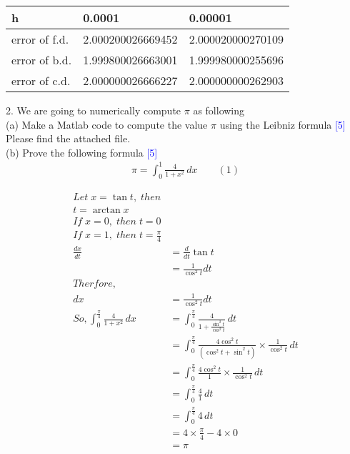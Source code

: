 \documentclass{article}
\begin{document}
\begin{table}[h]
\begin{tabular}{l|ll}
h             & 0.0001            & 0.00001           \\ \hline
error of f.d. & 2.000200026669452 & 2.000020000270109 \\
error of b.d. & 1.999800026663001 & 1.999980000255696 \\
error of c.d. & 2.000000026666227 & 2.000000000262903
\end{tabular}
\end{table}

\Large
2. We are going to numerically compute $\pi$ as following\\

\large
(a) Make a Matlab code to compute the value $\pi$ using the Leibniz formula \textcolor{blue}{[5]}\\

Please find the attached file.\\

(b) Prove the following formula \textcolor{blue}{[5]}\\

\begin{align*}
\pi = \int_{0}^{1} \frac{4}{1+x^2}\, dx \qquad (1)
\end{align*}

\begin{align*}
Let \; x = \tan t, \; then \\
t = \arctan x\\
If \; x = 0, \; then \; t=0 \\
If \; x = 1, \; then \; t=\frac{\pi}{4}\\
\frac{dx}{dt} &= \frac{d}{dt}\tan t \\
&= \frac{1}{\cos^2 t}dt \\
Therfore, \\
dx &= \frac{1}{\cos^2 t}dt \\
So, \int_{0}^{\frac{\pi}{4}} \frac{4}{1+x^2}\, dx &= \int_{0}^{\frac{\pi}{4}} \frac{4}{1+\frac{\sin^2 t}{\cos^2 t}}\, dt \\
&= \int_{0}^{\frac{\pi}{4}} \frac{4\cos^2 t}{(\cos^2 t+\sin^2 t)}\times\frac{1}{\cos^2 t}\, dt \\
&= \int_{0}^{\frac{\pi}{4}} \frac{4\cos^2 t}{1}\times\frac{1}{\cos^2 t} \, dt \\
&= \int_{0}^{\frac{\pi}{4}} \frac{4}{1}\, dt \\
&= \int_{0}^{\frac{\pi}{4}} 4\, dt \\
&= 4\times\frac{\pi}{4}-4\times0 \\
&= \pi
\end{align*}
\end{document}
